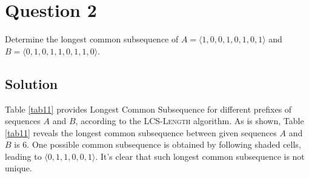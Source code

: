 
\section*{Question 2}

Determine the longest common subsequence of $A = \langle 1, 0, 0, 1, 0, 1, 0, 1 \rangle$ and $B = \langle 0, 1, 0, 1, 1, 0, 1, 1, 0 \rangle$.

\subsection*{Solution}

Table \ref{tab11} provides Longest Common Subsequence for different prefixes of sequences $A$ and $B$, according to the \textsc{LCS-Length} algorithm. As is shown, Table \ref{tab11} reveals the longest common subsequence between given sequences $A$ and $B$ is 6. One possible common subsequence is obtained by following shaded cells, leading to $\langle 0, 1, 1, 0, 0, 1 \rangle$. It's clear that such longest common subsequence is not unique.

